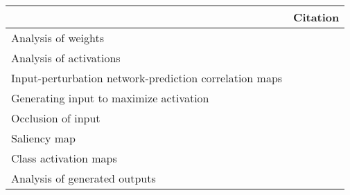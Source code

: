\begin{tabular}{ll}
\toprule
{} &                                                                                                                                                                                          Citation \\
\midrule
Analysis of weights                                    &  \cite{Perez-Benitez2018, Yoon2018, Langkvist2018, Deiss2018, Lawhern2018, Xu2016, Tsinalis2016a, Nurse2016, Tabar2016a, Zheng2015, Stober2015, Manor2015, Yang2015a, Langkvist2012, Cecotti2011} \\
Analysis of activations                                &                                                                                           \cite{Yuan2018a, Waytowich2018, Lawhern2018, kwak2017, Yin2017a, Supratak2017, Shamwell2016, Manor2015} \\
Input-perturbation network-prediction correlation maps &                                                                                                              \cite{Schirrmeister2017a, Volker2018, Hartmann2018b, Behncke2017, Schirrmeister2017} \\
Generating input to maximize activation                &                                                                                                                                      \cite{VanPutten2018b, Ruffini2018a, Sors2018, Bashivan2016a} \\
Occlusion of input                                     &                                                                                                                                                        \cite{Lee2018, Chambon2018, Thodoroff2016} \\
Saliency map                                           &                                                                                                                                                                               \cite{Vilamala2017} \\
Class activation maps                                  &                                                                                                                                                                                  \cite{Ghosh2018} \\
Analysis of generated outputs                          &                                                                                                                                                                               \cite{Hartmann2018} \\

\end{tabular}
